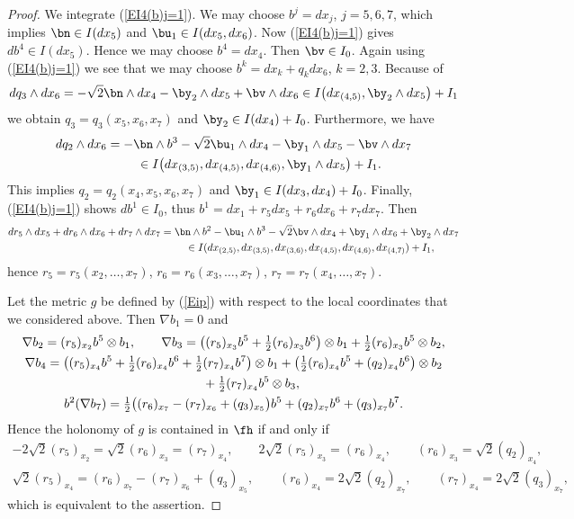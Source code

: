 \begin{proof} We integrate (\ref{EI4(b)j=1}). We may choose $b^j=dx_j$, $j=5,6,7$, which implies $\bn\in I(dx_5)$ and $\bu_1\in I(dx_5, dx_6)$. Now (\ref{EI4(b)j=1}) gives $db^4\in I(dx_5)$. Hence we may choose $b^4=dx_4$. Then $\bv\in I_0$. Again using (\ref{EI4(b)j=1}) we see that we may choose $b^k=dx_k+q_k dx_6$, $k=2,3$. Because of
\begin{gather*} dq_3\wedge dx_6=-\sqrt 2 \bn\wedge dx_4 -\by_2\wedge dx_5 +\bv\wedge dx_6\in I\big(dx_{(4,5)}, \by_2\wedge dx_5\big) +I_1\end{gather*}
we obtain $q_3=q_3(x_5,x_6,x_7)$ and $\by_2\in I(dx_4)+I_0$. Furthermore, we have
\begin{gather*}
 dq_2\wedge dx_6 =-\bn\wedge b^3-\sqrt 2 \bu_1\wedge dx_4 -\by_1\wedge dx_5 -\bv\wedge dx_7\\
\hphantom{dq_2\wedge dx_6}{} \in I\big(dx_{(3,5)},dx_{(4,5)},dx_{(4,6)}, \by_1\wedge dx_5\big) +I_1.
 \end{gather*}
This implies $q_2=q_2(x_4,x_5,x_6,x_7)$ and $\by_1\in I(dx_3,dx_4)+I_0$. Finally, (\ref{EI4(b)j=1}) shows $db^1\in I_0$, thus $b^1= dx_1 + r_5dx_5+r_6dx_6+r_7dx_7$. Then
\begin{gather*}
dr_5\wedge dx_5+dr_6\wedge dx_6+dr_7\wedge dx_7 = \bn\wedge b^2 -\bu_1\wedge b^3 - \sqrt 2 \bv\wedge dx_4+\by_1\wedge dx_6+\by_2\wedge dx_7\\
\hphantom{dr_5\wedge dx_5+dr_6\wedge dx_6+dr_7\wedge dx_7}{} \in I(dx_{(2,5)}, dx_{(3,5)}, dx_{(3,6)}, dx_{(4,5)}, dx_{(4,6)}, dx_{(4,7)}) +I_1,
\end{gather*}
hence $r_5=r_5(x_2,\dots, x_7)$, $r_6=r_6(x_3,\dots,x_7)$, $r_7=r_7(x_4,\dots,x_7)$.

Let the metric $g$ be defined by (\ref{Eip}) with respect to the local coordinates that we considered above. Then $\nabla b_1=0$ and
\begin{gather*}
\nabla b_2 = (r_5)_{x_2} b^5\otimes b_1,\qquad
\nabla b_3 = \big((r_5)_{x_3}b^5+\tfrac12 (r_6)_{x_3}b^6\big)\otimes b_1+\tfrac12 (r_6)_{x_3}b^5\otimes b_2,\\
\nabla b_4 = \big( (r_5)_{x_4}b^5+ \tfrac12 (r_6)_{x_4}b^6+\tfrac12 (r_7)_{x_4}b^7\big)\otimes b_1 + \big(\tfrac12 (r_6)_{x_4}b^5+(q_2)_{x_4} b^6\big)\otimes b_2\\
\hphantom{\nabla b_4 =}{} + \tfrac12 (r_7)_{x_4} b^5\otimes b_3,\\
b^2(\nabla b_7) = \tfrac12 \big( (r_6)_{x_7}-(r_7)_{x_6}+(q_3)_{x_5} \big)b^5+ (q_2)_{x_7}b^6 +(q_3)_{x_7}b^7.
\end{gather*}
Hence the holonomy of $g$ is contained in $\fh$ if and only if
\begin{gather*}
-2\sqrt2(r_5)_{x_2} =\sqrt2(r_6)_{x_3}=(r_7)_{x_4}, \qquad
{2\sqrt2}(r_5)_{x_3} =(r_6)_{x_4},\qquad (r_6)_{x_3}= {\sqrt2}(q_2)_{x_4}, \\
\sqrt2 (r_5)_{x_4} = (r_6)_{x_7}-(r_7)_{x_6}+(q_3)_{x_5},\qquad (r_6)_{x_4}=2\sqrt2 (q_2)_{x_7},\qquad (r_7)_{x_4}=2\sqrt2 (q_3)_{x_7},
\end{gather*}
which is equivalent to the assertion.
\end{proof}
